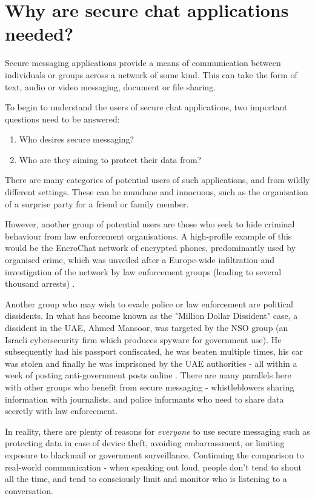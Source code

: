 \documentclass{mproj}
\begin{document}
\section{Why are secure chat applications needed?}
Secure messaging applications provide a means of communication between individuals or groups across a network of some kind. This can take the form of text, audio or video messaging, document or file sharing.

To begin to understand the users of secure chat applications, two important questions need to be answered:
\begin{enumerate}
	\item Who desires secure messaging?
	\item Who are they aiming to protect their data from?
\end{enumerate}

There are many categories of potential users of such applications, and from wildly different settings. These can be mundane and innocuous, such as the organisation of a surprise party for a friend or family member. 

However, another group of potential users are those who seek to hide criminal behaviour from law enforcement organisations. A high-profile example of this would be the EncroChat network of encrypted phones, predominantly used by organised crime, which was unveiled after a Europe-wide infiltration and investigation of the network by law enforcement groups (leading to several thousand arrests) \cite{sommer2022evidence}. 

Another group who may wish to evade police or law enforcement are political dissidents. In what has become known as the "Million Dollar Dissident" \cite{marczak2018hide} case, a dissident in the UAE, Ahmed Mansoor, was targeted by the NSO group (an Israeli cybersecurity firm which produces spyware for government use). He subsequently had his passport confiscated, he was beaten multiple times, his car was stolen and finally he was imprisoned by the UAE authorities - all within a week of posting anti-government posts online \cite{mazzetti2019new}. There are many parallels here with other groups who benefit from secure messaging - whistleblowers sharing information with journalists, and police informants who need to share data secretly with law enforcement. 

In reality, there are plenty of reasons for \emph{everyone} to use secure messaging such as protecting data in case of device theft, avoiding embarrassment, or limiting exposure to blackmail or government surveillance. Continuing the comparison to real-world communication - when speaking out loud, people don't tend to shout all the time, and tend to consciously limit and monitor who is listening to a conversation.
\end{document}
